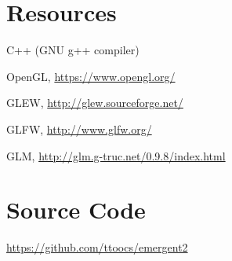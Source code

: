 \documentclass[12pt]{article}
\begin{document}
\section*{Resources}

\begin{enumerate}[label={[\arabic*]}]
	\item C++ (GNU g++ compiler)
	
	\item OpenGL, \url{https://www.opengl.org/}
	
	\item GLEW, \url{http://glew.sourceforge.net/}
	
	\item GLFW, \url{http://www.glfw.org/}
	
	\item GLM, \url{http://glm.g-truc.net/0.9.8/index.html}
\end{enumerate}

\section*{Source Code}
\url{https://github.com/ttoocs/emergent2}
\end{document}

